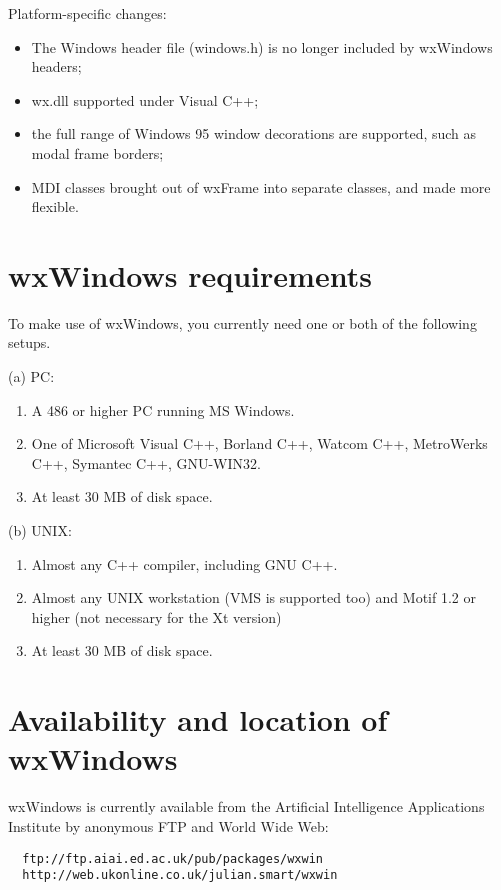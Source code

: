 Platform-specific changes:

\begin{itemize}\itemsep=0pt
\item The Windows header file (windows.h) is no longer included by wxWindows headers;
\item wx.dll supported under Visual C++;
\item the full range of Windows 95 window decorations are supported, such as modal frame
borders;
\item MDI classes brought out of wxFrame into separate classes, and made more flexible.
\end{itemize}

\section{wxWindows requirements}\label{requirements}

To make use of wxWindows, you currently need one or both of the
following setups.

(a) PC:

\begin{enumerate}\itemsep=0pt
\item A 486 or higher PC running MS Windows.
\item One of Microsoft Visual C++, Borland C++, Watcom C++, MetroWerks C++,
Symantec C++, GNU-WIN32.
\item At least 30 MB of disk space.
\end{enumerate}

(b) UNIX:

\begin{enumerate}\itemsep=0pt
\item Almost any C++ compiler, including GNU C++.
\item Almost any UNIX workstation (VMS is supported too) and Motif 1.2 or higher (not necessary
for the Xt version)
\item At least 30 MB of disk space.
\end{enumerate}

\section{Availability and location of wxWindows}

wxWindows is currently available from the Artificial Intelligence
Applications Institute by anonymous FTP and World Wide Web:

\begin{verbatim}
  ftp://ftp.aiai.ed.ac.uk/pub/packages/wxwin
  http://web.ukonline.co.uk/julian.smart/wxwin
\end{verbatim}

